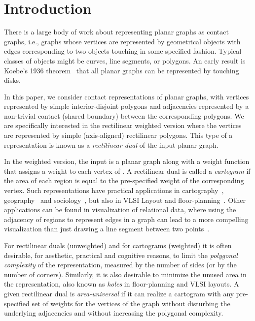 \documentclass[11pt]{article}
\begin{document}
\newpage

\section{Introduction}
\label{sec:intro}

There is a large body of work about representing planar graphs as
contact graphs, i.e., graphs whose vertices are represented by
geometrical objects with edges corresponding to two objects touching
in some specified fashion. Typical classes of objects might be curves,
line segments,  or polygons. An early result is Koebe's 1936 theorem~\cite{Koebe36} that all planar graphs can be represented by
 touching disks.

In this paper, we consider contact representations of planar graphs, with vertices represented by simple interior-disjoint polygons
 and adjacencies represented by a non-trivial contact (shared boundary)
between the
 corresponding polygons. We are specifically interested in the
 rectilinear weighted version where the vertices are represented by
 simple (axis-aligned) rectilinear polygons.
This type of a representation is known
 as a {\em rectilinear dual} of the input planar graph.

 In the weighted version, the input is a planar graph  along with a weight function  that
 assigns a weight to each vertex of . A rectilinear dual is called a \textit{cartogram} if the area
 of each region is equal to the pre-specified weight of the
 corresponding vertex.  Such representations have practical applications in
 cartography~\cite{r-rsc-34}, geography~\cite{Tobler04thirtyfive} and sociology~\cite{HK98}, but also in VLSI Layout and
 floor-planning~\cite{MCP2002}.
Other applications can be found in visualization of relational data,
where using the adjacency of regions to represent edges in a graph can lead
 to a more compelling visualization than just drawing a line segment
 between two points~\cite{Buchsbaum08}.


 For rectilinear duals (unweighted) and for cartograms (weighted) it
 is often desirable, for aesthetic, practical and cognitive reasons,
 to limit the {\em polygonal complexity} of the representation,
 measured by the number of sides (or by the number of corners).
 Similarly, it is also desirable to minimize the unused area in the
 representation, also known as {\em holes} in floor-planning and VLSI
 layouts. A given rectilinear dual is {\em area-universal} if it can
 realize a cartogram with any pre-specified set of weights for the
 vertices of the graph without disturbing the underlying adjacencies
 and without increasing the polygonal complexity.
\end{document}
